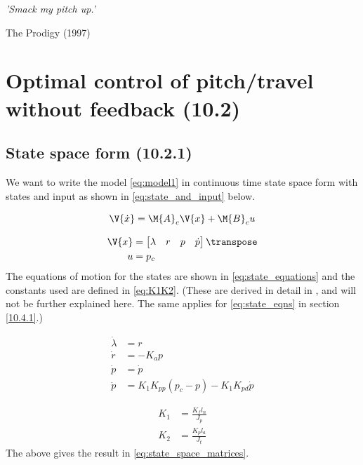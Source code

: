 \epigraph{\textit{'Smack my pitch up.'}}{The Prodigy (1997)}

\section{Optimal control of pitch/travel without feedback (10.2)}

\subsection{State space form (10.2.1)}
We want to write the model \eqref{eq:model1} in continuous time state space form with states and input as shown in \eqref{eq:state_and_input} below.

\begin{equation}\label{eq:model1}
	\V{\dot{x}} = \M{A}_{c}\V{x} + \M{B}_{c}u
\end{equation}

\begin{equation}\label{eq:state_and_input}
\begin{aligned}
	\V{x} 	&= \begin{bmatrix}\lambda & r & p & \dot{p} \end{bmatrix}\transpose \\
	u 		&= p_{c}
\end{aligned}
\end{equation}
The equations of motion for the states are shown in \eqref{eq:state_equations} and the constants used are defined in \eqref{eq:K1K2}. (These are derived in detail in \cite{_helicopter_2015}, and will not be further explained here. The same applies for \eqref{eq:state_eqns} in section \ref{10.4.1}.)

\begin{equation}\label{eq:state_equations}
\begin{aligned}
	\dot{\lambda} 	&= r \\
	\dot{r} 		&= - K_{a} p \\
	\dot{p} 		&= \dot{p} \\
	\ddot{p} 		&= K_{1} K_{pp} (p_{c} - p) - K_{1} K_{pd} \dot{p}
\end{aligned}
\end{equation}

\begin{equation}\label{eq:K1K2}
\begin{aligned}
	K_{1} &= \frac{K_{f} l_{n}}{J_{p}} \\
	K_{2} &= \frac{K_{p} l_{a}}{J_{t}}
\end{aligned}
\end{equation}
The above gives the result in \eqref{eq:state_space_matrices}.

